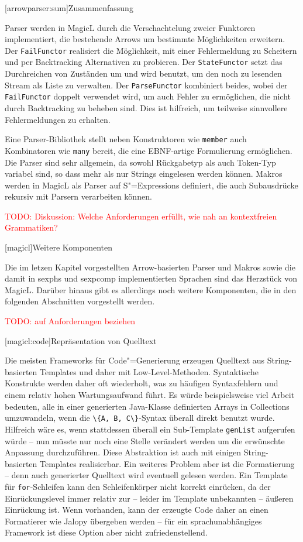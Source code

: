 \documentclass[12pt, a4paper, bibgerm]{scrbook}
\newcommand\icode[1]{\lstinline?#1?}
\newcommand{\todo}[1]{
  \textcolor{red}{TODO: #1}
}
\newcommand\lchapter{}
\newcommand\lsection{}
\newcommand\cref{}
\newcommand{\sexps}{S"=Expressions}
\newcommand{\cgen}{Code"=Generierung}
\begin{document}
\lsection[arrowparser:sum]{Zusammenfassung}

Parser werden in MagicL durch die Verschachtelung zweier Funktoren
implementiert, die bestehende Arrows um bestimmte Möglichkeiten
erweitern. Der \icode{FailFunctor} realisiert die Möglichkeit, mit einer
Fehlermeldung zu Scheitern und per Backtracking Alternativen zu
probieren. Der \icode{StateFunctor} setzt das Durchreichen von Zuständen
um und wird benutzt, um den noch zu lesenden Stream als Liste zu
verwalten. Der \icode{ParseFunctor} kombiniert beides, wobei der
\icode{FailFunctor} doppelt verwendet wird, um auch Fehler zu
ermöglichen, die nicht durch Backtracking zu beheben sind. Dies ist
hilfreich, um teilweise sinnvollere Fehlermeldungen zu erhalten.

Eine Parser-Bibliothek stellt neben Konstruktoren wie \icode{member}
auch Kombinatoren wie \icode{many} bereit, die eine EBNF-artige
Formulierung ermöglichen. Die Parser sind sehr allgemein, da sowohl
Rückgabetyp als auch Token-Typ variabel sind, so dass mehr als nur
Strings eingelesen werden können. Makros werden in MagicL als Parser auf
\sexps{} definiert, die auch Subausdrücke rekursiv mit Parsern
verarbeiten können.

\todo{Diskussion: Welche Anforderungen erfüllt, wie nah an kontextfreien
Grammatiken?}

\lchapter[magicl]{Weitere Komponenten}

Die im letzen Kapitel vorgestellten Arrow-basierten Parser und Makros
sowie die damit in \cref{sexphs} und \cref{sexpcomp} implementierten
Sprachen sind das Herzstück von MagicL. Darüber hinaus gibt es
allerdings noch weitere Komponenten, die in den folgenden Abschnitten
vorgestellt werden.

\todo{auf Anforderungen beziehen}

\lsection[magicl:code]{Repräsentation von Quelltext}

Die meisten Frameworks für \cgen{} erzeugen Quelltext aus
String-basierten Templates und daher mit
Low-Level-Methoden. Syntaktische Konstrukte werden daher oft wiederholt,
was zu häufigen Syntaxfehlern und einem relativ hohen Wartungsaufwand
führt. Es würde beispielsweise viel Arbeit bedeuten, alle in einer
generierten Java-Klasse definierten Arrays in Collections umzuwandeln,
wenn die \icode{\{A, B, C\}}-Syntax überall direkt benutzt
wurde. Hilfreich wäre es, wenn stattdessen überall ein Sub-Template
\icode{genList} aufgerufen würde -- nun müsste nur noch eine Stelle
verändert werden um die erwünschte Anpassung durchzuführen. Diese
Abstraktion ist auch mit einigen String-basierten Templates
realisierbar. Ein weiteres Problem aber ist die Formatierung -- denn auch
generierter Quelltext wird eventuell gelesen werden. Ein Template für
\icode{for}-Schleifen kann den Schleifenkörper nicht korrekt einrücken,
da der Einrückungslevel immer relativ zur -- leider im Template
unbekannten -- äußeren Einrückung ist.  Wenn vorhanden, kann der erzeugte
Code daher an einen Formatierer wie Jalopy \cite{Jalopy} übergeben werden --
für ein sprachunabhängiges Framework ist diese Option aber nicht
zufriedenstellend.
\end{document}
